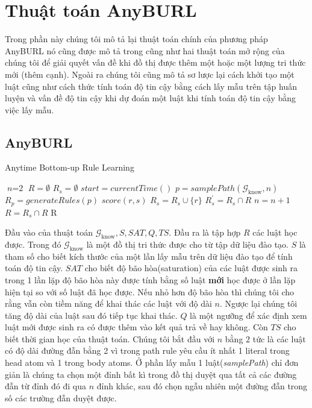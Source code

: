 \section{Thuật toán AnyBURL} \label{myalgorithm}
Trong phần này chúng tôi mô tả lại thuật toán chính của phương pháp AnyBURL nó cũng được mô tả trong \cite{burl} cũng như hai thuật toán mở rộng của chúng tôi để giải quyết vấn đề khi đồ thị được thêm một hoặc một lượng tri thức mới (thêm cạnh). Ngoài ra chúng tôi cũng mô tả sơ lược lại cách khởi tạo một luật cũng như cách thức tính toán độ tin cậy bằng cách lấy mẫu trên tập huấn luyện và vấn đề độ tin cậy khi dự đoán một luật khi tính toán độ tin cậy bằng việc lấy mẫu.
\subsection{AnyBURL}
\begin{algorithm}
	\caption{Anytime Bottom-up Rule Learning}\label{algorithm1}
	\begin{algorithmic}[1]
		\State $\textit{n} = \text{2}$
		\State $R = \emptyset$
		\Loop
		\State $R_s = \emptyset$
		\State $start = currentTime()$
		\Repeat
		\State $p = samplePath(\mathcal{G}_{\text{know}}, n)$
		\State $R_p = generateRules(p)$
		\State $score(r, s)$
		\State $R_s = R_s \cup \{r\}$
		\EndIf
		\EndFor
		\State $R^{\prime}_s = R_s \cap R$
		\State $n = n + 1$
		\EndIf
		\State $R = R_s \cap R$
		\EndLoop
		\Return R
		\EndProcedure
	\end{algorithmic}
\end{algorithm}

Đầu vào của thuật toán \(\mathcal{G}_{\text{know}}, S, SAT, Q, TS\). Đầu ra là tập hợp \(R\) các luật học được. Trong đó \(\mathcal{G}_{\text{know}}\) là một đồ thị tri thức được cho từ tập dữ liệu đào tạo. \(S\) là tham số cho biết kích thước của một lần lấy mẫu trên dữ liệu đào tạo để tính toán độ tin cậy. \(SAT\) cho biết độ bão hòa(saturation) của các luật được sinh ra trong 1 lần lặp độ bão hòa này được tính bằng số luật \textbf{mới} học được ở lần lặp hiện tại so với số luật đã học được. Nếu nhỏ hơn độ bão hòa thì chúng tôi cho rằng vẫn còn tiềm năng để khai thác các luật với độ dài \(n\). Ngược lại chúng tôi tăng độ dài của luật sau đó tiếp tục khai thác. \(Q\) là một ngưỡng để xác định xem luật mới được sinh ra có được thêm vào kết quả trả về hay không. Còn \(TS\) cho biết thời gian học của thuật toán. Chúng tôi bắt đầu với \(n\) bằng \(2\) tức là các luật có độ dài đường đẫn bằng 2 vì trong path rule yêu cầu ít nhất 1 literal trong head atom và 1 trong body atoms. Ở phần lấy mẫu 1 luật(\textit{samplePath}) chỉ đơn giản là chúng ta chọn một đỉnh bất kì trong đồ thị duyệt qua tất cả các đường đẫn từ đỉnh đó đi qua \(n\) đỉnh khác, sau đó chọn ngẫu nhiên một đường đẫn trong số các trường đẫn duyệt được.

